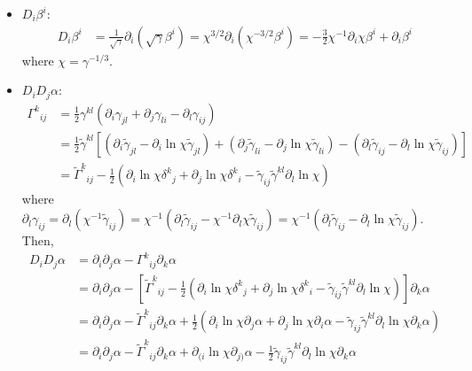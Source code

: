 \documentclass[prd,aps,a4paper,superscriptaddress,onecolumn,footinbib]{revtex4}
\begin{document}
\begin{itemize}
\item $D_i\beta^i$:
  \begin{align}
    D_i\beta^i
    &=\frac{1}{\sqrt{\gamma}}\partial_i\left(\sqrt{\gamma}\beta^i\right)
    =\chi^{3/2}\partial_i\left(\chi^{-3/2}\beta^i\right)
    =-\frac{3}{2}\chi^{-1}\partial_i\chi\beta^i+\partial_i\beta^i
  \end{align}
  where $\chi=\gamma^{-1/3}$.
\item $D_iD_j\alpha$:
  \begin{align}
    \Gamma^{k}{}_{ij}
    &=\frac{1}{2}\gamma^{kl}(\partial_i\gamma_{jl}+\partial_j\gamma_{li}-\partial_l\gamma_{ij})
    \\
    &=\frac{1}{2}\tilde\gamma^{kl}
    \left[
      (\partial_i\tilde\gamma_{jl}-\partial_i\ln\chi\tilde\gamma_{jl})+
      (\partial_j\tilde\gamma_{li}-\partial_j\ln\chi\tilde\gamma_{li})-
      (\partial_l\tilde\gamma_{ij}-\partial_l\ln\chi\tilde\gamma_{ij})
    \right]
    \\
    &=\tilde\Gamma^k{}_{ij}
    -\frac{1}{2}
    (\partial_i\ln\chi\delta^k{}_j+\partial_j\ln\chi\delta^k{}_i
    -\tilde\gamma_{ij}\tilde\gamma^{kl}\partial_l\ln\chi)
  \end{align}
  where
  $\partial_l\gamma_{ij}=\partial_l(\chi^{-1}\tilde\gamma_{ij})
  =\chi^{-1}(\partial_l\tilde{\gamma}_{ij}-\chi^{-1}\partial_l\chi\tilde\gamma_{ij})
  =\chi^{-1}(\partial_l\tilde{\gamma}_{ij}-\partial_l\ln\chi\tilde\gamma_{ij})$.
  Then,
  \begin{align}
    D_iD_j\alpha
    &=\partial_i\partial_j\alpha-\Gamma^k{}_{ij}\partial_k\alpha \\
    &=\partial_i\partial_j\alpha-
    \left[
      \tilde\Gamma^k{}_{ij}
      -\frac{1}{2}
      (\partial_i\ln\chi\delta^k{}_j+\partial_j\ln\chi\delta^k{}_i
      -\tilde\gamma_{ij}\tilde\gamma^{kl}\partial_l\ln\chi)
    \right]\partial_k\alpha \\
    &=\partial_i\partial_j\alpha-
    \tilde\Gamma^k{}_{ij}\partial_k\alpha
    +\frac{1}{2}
    (\partial_i\ln\chi\partial_j\alpha
    +\partial_j\ln\chi\partial_i\alpha
    -\tilde\gamma_{ij}\tilde\gamma^{kl}\partial_l\ln\chi\partial_k\alpha) \\
    &=\partial_i\partial_j\alpha-
    \tilde\Gamma^k{}_{ij}\partial_k\alpha
    +\partial_{(i}\ln\chi\partial_{j)}\alpha
    -\frac{1}{2}\tilde\gamma_{ij}\tilde\gamma^{kl}\partial_l\ln\chi\partial_k\alpha
  \end{align}


\end{itemize}
\end{document}
